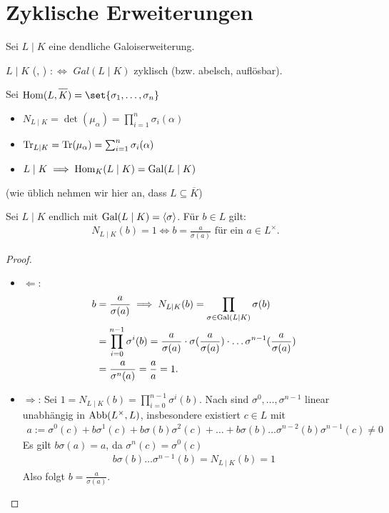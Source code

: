 \section{Zyklische Erweiterungen}
Sei $L \mid K$ eine dendliche Galoiserweiterung.
\begin{definition}
	$L\mid K$  (, ) $:\Leftrightarrow$ $Gal(L\mid K)$ zyklisch (bzw. abelsch, auflösbar).
\end{definition}
\begin{remark}[Erinnerung]
	Sei $\Hom(L,\overline{K}) = \set{\sigma_1,\dots, \sigma_n}$
	\begin{itemize}
		\item $N_{L \mid K} = \det(\mu_{\alpha}) = \prod_{i=1}^n \sigma_i(\alpha)$
		\item $\operatorname{Tr}_{L\mid K} = \operatorname{Tr}(\mu_{\alpha}) = \sum_{i=1}^n \sigma_i(\alpha)$
		\item $L \mid K \implies \operatorname{Hom}_K(L\mid K) = \operatorname{Gal}(L\mid K)$
	\end{itemize}
	(wie üblich nehmen wir hier an, dass $L \subseteq \overline{K}$)
\end{remark}
\begin{proposition}
	Sei $L \mid K$ endlich mit $\operatorname{Gal}(L \mid K) = \langle \sigma\rangle$. Für $b \in L$ gilt:
	\begin{align*}
		N_{L\mid K}(b)  = 1 \Leftrightarrow b = \frac{a}{\sigma(a)} \text{ für ein } a \in L^{\times}.
	\end{align*}
\end{proposition}
\begin{proof}
	\begin{itemize}
		Sei $n= [L:K]$.
		\item $\Leftarrow$:
		\begin{align*}
			b &= \frac{a}{\sigma(a)} \implies N_{L\mid K} (b) = \prod_{\sigma \in \operatorname{Gal}(L\mid K)} \sigma(b)\\
			&= \prod_{i=0}^{n-1} \sigma^i(b) = \frac{a}{\sigma(a)}\cdot \sigma(\frac{a}{\sigma(a)})\cdot \dots \sigma^{n-1}(\frac{a}{\sigma(a)})\\
			&= \frac{a}{\sigma^n(a)} = \frac{a}{a} = 1.
		\end{align*}
		\item $\Rightarrow$: Sei $1 = N_{L\mid K}(b) = \prod_{i=0}^{n-1} \sigma^i(b)$. Nach  sind $\sigma^0, \dots, \sigma^{n-1}$ linear unabhängig in $\operatorname{Abb}(L^{\times},L)$, insbesondere existiert $c \in L$ mit 
		\begin{align*}
			a:= \sigma^0(c) + b\sigma^1(c) + b\sigma(b)\sigma^2(c) + \dots + b \sigma(b)...\sigma^{n-2}(b)\sigma^{n-1}(c) \neq 0
		\end{align*}
		Es gilt $b\sigma(a) = a$, da $\sigma^n(c) = \sigma^0(c)$
		\begin{align*}
			b\sigma(b)\dots \sigma^{n-1}(b) = N_{L\mid K}(b) = 1
		\end{align*}
		Also folgt $b = \frac{a}{\sigma(a)}$.
	\end{itemize}
\end{proof}
